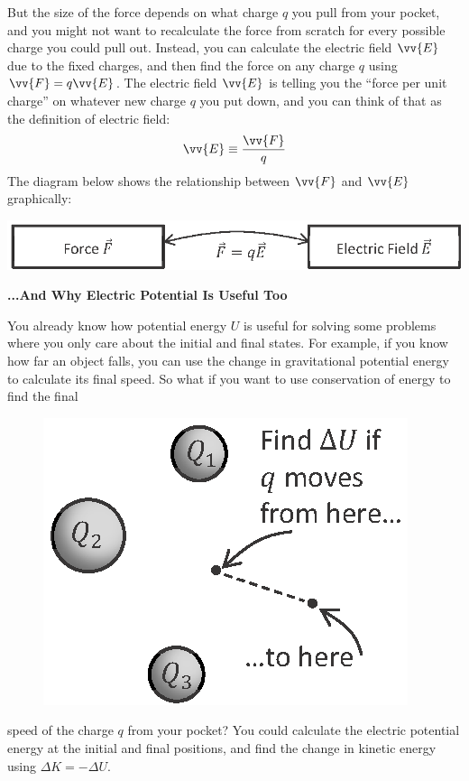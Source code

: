 But the size of the force depends on what charge $q$ you pull from your pocket, and you might not want to recalculate the force from scratch for every possible charge you could pull out.  Instead, you can calculate the electric field $\vv{E}$ due to the fixed charges, and then find the force on any charge $q$ using $\vv{F}=q\vv{E}$.  The electric field $\vv{E}$ is telling you the ``force per unit charge'' on whatever new charge $q$ you put down, and you can think of that as the definition of electric field:
$$\vv{E} \equiv \frac{\vv{F}}{q}$$
The diagram below shows the relationship between $\vv{F}$ and $\vv{E}$ graphically:

\begin{center}
\vspace{-0.1 in}
\includegraphics{potential_intro/concept_map_figs/concept_map_F_and_E.eps}
\vspace{-0.1 in}
\end{center}


\textbf{...And Why Electric Potential Is Useful Too}

You already know how potential energy $U$ is useful for solving some problems where you only care about the initial and final states.  For example, if you know how far an object falls, you can use the change in gravitational 
potential energy to calculate its final speed.  
So what if you want to use conservation of energy to find the final 
\begin{figure}
\begin{center}
\vspace{-0.3 in}
\includegraphics[scale=0.8]{potential_intro/activity_3_figs/charge_from_pocket_potential.eps}
\end{center}
\end{figure}
speed of the charge $q$ from your pocket?  You could calculate the electric potential energy at the initial and final positions, and find the change in kinetic energy using $\Delta K = -\Delta U$.

